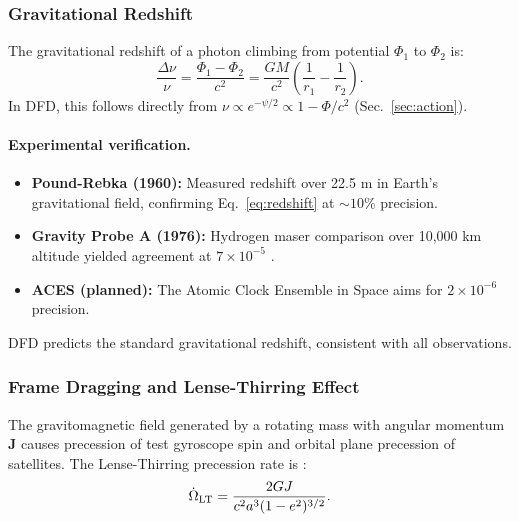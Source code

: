 \subsubsection{Gravitational Redshift}\label{sec:ppn-redshift}

The gravitational redshift of a photon climbing from potential $\Phi_1$ to $\Phi_2$ is:
\begin{equation}\label{eq:redshift}
\frac{\Delta\nu}{\nu} = \frac{\Phi_1 - \Phi_2}{c^2} = \frac{GM}{c^2}\left(\frac{1}{r_1} - \frac{1}{r_2}\right).
\end{equation}
In DFD, this follows directly from $\nu \propto e^{-\psi/2} \propto 1 - \Phi/c^2$ (Sec.~\ref{sec:action}).

\paragraph{Experimental verification.}
\begin{itemize}
\item \textbf{Pound-Rebka (1960):} Measured redshift over 22.5 m in Earth's gravitational field, confirming Eq.~\eqref{eq:redshift} at $\sim 10\%$ precision.
\item \textbf{Gravity Probe A (1976):} Hydrogen maser comparison over 10,000 km altitude yielded agreement at $7 \times 10^{-5}$ \cite{Vessot1980}.
\item \textbf{ACES (planned):} The Atomic Clock Ensemble in Space aims for $2 \times 10^{-6}$ precision.
\end{itemize}

DFD predicts the standard gravitational redshift, consistent with all observations.

\subsubsection{Frame Dragging and Lense-Thirring Effect}\label{sec:ppn-frame-dragging}

The gravitomagnetic field generated by a rotating mass with angular momentum $\mathbf{J}$ causes precession of test gyroscope spin and orbital plane precession of satellites. The Lense-Thirring precession rate is \cite{LenseThirring1918}:
\begin{equation}\label{eq:lense-thirring}
\dot{\Omega}_{\rm LT} = \frac{2GJ}{c^2 a^3 (1-e^2)^{3/2}}.
\end{equation}

